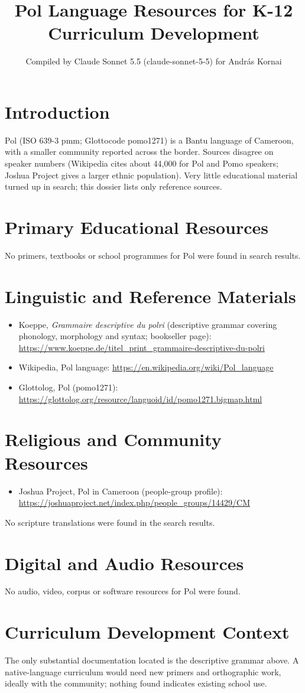 \documentclass[12pt]{article}
\title{Pol Language Resources for K-12 Curriculum Development}
\author{Compiled by Claude Sonnet 5.5 (claude-sonnet-5-5) for Andr\'as Kornai}
\date{}
\begin{document}
\maketitle

\section{Introduction}
Pol (ISO 639-3 pmm; Glottocode pomo1271) is a Bantu language of Cameroon, with a smaller community reported across the border. Sources disagree on speaker numbers (Wikipedia cites about 44,000 for Pol and Pomo speakers; Joshua Project gives a larger ethnic population). Very little educational material turned up in search; this dossier lists only reference sources.

\section{Primary Educational Resources}
No primers, textbooks or school programmes for Pol were found in search results.

\section{Linguistic and Reference Materials}
\begin{itemize}
\item Koeppe, \emph{Grammaire descriptive du polri} (descriptive grammar covering phonology, morphology and syntax; bookseller page): \url{https://www.koeppe.de/titel_print_grammaire-descriptive-du-polri}
\item Wikipedia, Pol language: \url{https://en.wikipedia.org/wiki/Pol_language}
\item Glottolog, Pol (pomo1271): \url{https://glottolog.org/resource/languoid/id/pomo1271.bigmap.html}
\end{itemize}

\section{Religious and Community Resources}
\begin{itemize}
\item Joshua Project, Pol in Cameroon (people-group profile): \url{https://joshuaproject.net/index.php/people_groups/14429/CM}
\end{itemize}
No scripture translations were found in the search results.

\section{Digital and Audio Resources}
No audio, video, corpus or software resources for Pol were found.

\section{Curriculum Development Context}
The only substantial documentation located is the descriptive grammar above. A native-language curriculum would need new primers and orthographic work, ideally with the community; nothing found indicates existing school use.
\end{document}
